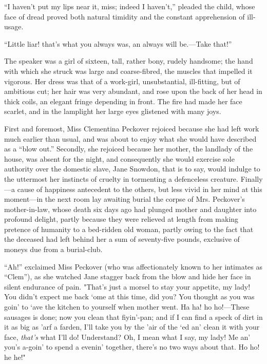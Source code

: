 ``I haven't put my lips near it, miss; indeed I haven't,'' pleaded the
child, whose face of dread proved both natural timidity and the constant
apprehension of ill-usage.

``Little liar! that's what you always was, an always will be.---Take
that!''

{}The speaker was a girl of sixteen, tall, rather bony, rudely handsome;
the hand with which she struck was large and coarse-fibred, the muscles
that impelled it vigorous. Her dress was that of a work-girl,
unsubstantial, ill-fitting, but of ambitious cut; her hair was very
abundant, and rose upon the back of her head in thick coils, an elegant
fringe depending in front. The fire had made her face scarlet, and in
the lamplight her large eyes glistened with many joys.

First and foremost, Miss Clementina Peckover rejoiced because she had
left work much earlier than usual, and was about to enjoy what she would
have described as a ``blow out.'' Secondly, she rejoiced because her
mother, the landlady of the house, was absent for the night, and
consequently she would exercise sole authority over the domestic slave,
Jane Snowdon, that is to say, would indulge to the uttermost her
instincts of cruelty in tormenting a defenceless creature. Finally---a
cause of happiness antecedent to {}the others, but less vivid in her
mind at this moment---in the next room lay awaiting burial the corpse of
Mrs. Peckover's mother-in-law, whose death six days ago had plunged
mother and daughter into profound delight, partly because they were
relieved at length from making pretence of humanity to a bed-ridden old
woman, partly owing to the fact that the deceased had left behind her a
sum of seventy-five pounds, exclusive of moneys due from a burial-club.

``Ah!'' exclaimed Miss Peckover (who was affectionately known to her
intimates as ``Clem''), as she watched Jane stagger back from the blow
and hide her face in silent endurance of pain. "That's just a morsel to
stay your appetite, my lady! You didn't expect me back `ome at this
time, did you? You thought as you was goin' to `ave the kitchen to
yourself when mother went. Ha ha! ho ho!---These sausages is done; now
you clean that fiyin'-pan; and if I can find a speck of dirt in it as
big as 'arf a farden, I'll take you by the 'air of {}the `ed an' clean
it with your face, \emph{that's} what I'll do! Understand? Oh, I mean
what I say, my lady! Me an' you's a-goin' to spend a evenin' together,
there's no two ways about that. Ho ho! he he!"

